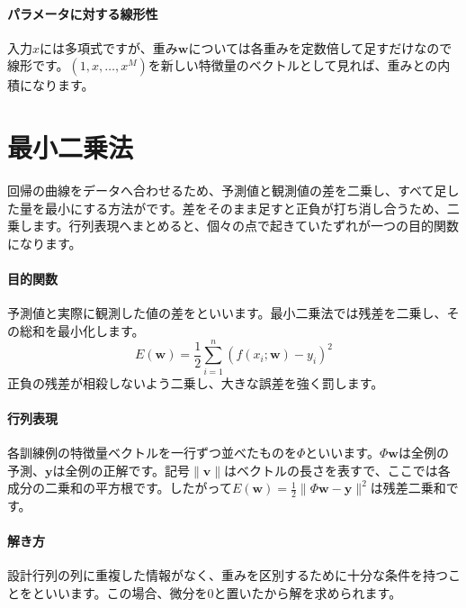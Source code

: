\paragraph{パラメータに対する線形性}
        入力$x$には多項式ですが、重み$\mathbf{w}$については各重みを定数倍して足すだけなので線形です。$(1,x,\ldots,x^M)$を新しい特徴量のベクトルとして見れば、重みとの内積になります。

\par
\endgroup
\par
\endgroup


\section{最小二乗法}
\label{sec:06-machine-learning-09}

回帰の曲線をデータへ合わせるため、予測値と観測値の差を二乗し、すべて足した量を最小にする方法がです。差をそのまま足すと正負が打ち消し合うため、二乗します。行列表現へまとめると、個々の点で起きていたずれが一つの目的関数になります。

\begingroup
\begingroup
\paragraph{目的関数}
        予測値と実際に観測した値の差をといいます。最小二乗法では残差を二乗し、その総和を最小化します。
        \[
          E(\mathbf{w})=
          \frac{1}{2}\sum_{i=1}^{n}
          \left(f(x_i;\mathbf{w})-y_i\right)^2
        \]
        正負の残差が相殺しないよう二乗し、大きな誤差を強く罰します。

\paragraph{行列表現}
        各訓練例の特徴量ベクトルを一行ずつ並べたものを$\Phi$といいます。$\Phi\mathbf{w}$は全例の予測、$\mathbf{y}$は全例の正解です。記号$\lVert\mathbf{v}\rVert$はベクトルの長さを表すで、ここでは各成分の二乗和の平方根です。したがって$E(\mathbf{w})=\frac12\lVert\Phi\mathbf{w}-\mathbf{y}\rVert^2$は残差二乗和です。

\par
\endgroup
\medskip
\begingroup
\paragraph{解き方}
        設計行列の列に重複した情報がなく、重みを区別するために十分な条件を持つことをといいます。この場合、微分を0と置いたから解を求められます。

